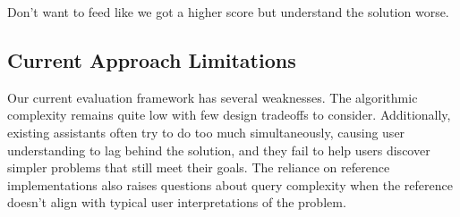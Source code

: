 \documentclass{article}
\begin{document}
Don't want to feed like we got a higher score but understand the solution worse.

\subsection{Current Approach Limitations}

Our current evaluation framework has several weaknesses. The algorithmic complexity remains quite low with few design tradeoffs to consider. Additionally, existing assistants often try to do too much simultaneously, causing user understanding to lag behind the solution, and they fail to help users discover simpler problems that still meet their goals. The reliance on reference implementations also raises questions about query complexity when the reference doesn't align with typical user interpretations of the problem.

\printbibliography
\end{document}
